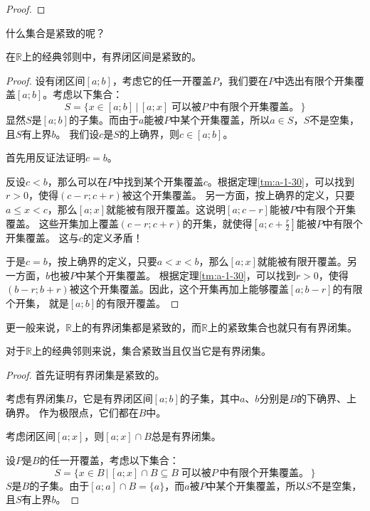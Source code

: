 \documentclass[12pt,UTF8]{ctexbook}
\begin{document}
\begin{appendix}
\begin{proof}
\end{proof}

什么集合是紧致的呢？

\begin{tm}\label{tm:a-3-10}
    在$\mathbb{R}$上的经典邻则中，有界闭区间是紧致的。
\end{tm}

\begin{proof}
    设有闭区间$[a;b]$，考虑它的任一开覆盖$P$，我们要在$P$中选出有限个开集覆盖$[a;b]$。考虑以下集合：
    $$ S = \{ x\in[a;b] \, | \, [a;x] \; \mbox{可以被}P\,\mbox{中有限个开集覆盖。} \, \} $$
    显然$S$是$[a;b]$的子集。而由于$a$能被$P$中某个开集覆盖，所以$a\in S$，$S$不是空集，且$S$有上界$b$。
    我们设$c$是$S$的上确界，则$c\in[a;b]$。

    首先用反证法证明$c=b$。

    反设$c < b$，那么可以在$P$中找到某个开集覆盖$c$。根据定理\ref{tm:a-1-30}，可以找到$r>0$，使得$(c-r;c+r)$被这个开集覆盖。
    另一方面，按上确界的定义，只要$a\leqslant x<c$，那么$[a;x]$就能被有限开覆盖。这说明$[a;c-r]$能被$P$中有限个开集覆盖。
    这些开集加上覆盖$(c-r;c+r)$的开集，就使得$\displaystyle\left[a;c+\frac{r}{2}\right]$能被$P$中有限个开集覆盖。
    这与$c$的定义矛盾！

    于是$c=b$，按上确界的定义，只要$a<x<b$，那么$[a;x]$就能被有限开覆盖。另一方面，$b$也被$P$中某个开集覆盖。
    根据定理\ref{tm:a-1-30}，可以找到$r>0$，使得$(b-r;b+r)$被这个开集覆盖。因此，这个开集再加上能够覆盖$[a;b-r]$的有限个开集，
    就是$[a;b]$的有限开覆盖。

\end{proof}

更一般来说，$\mathbb{R}$上的有界闭集都是紧致的，而$\mathbb{R}$上的紧致集合也就只有有界闭集。

\begin{tm}
    对于$\mathbb{R}$上的经典邻则来说，集合紧致当且仅当它是有界闭集。
\end{tm}

\begin{proof}
    首先证明有界闭集是紧致的。
    
    考虑有界闭集$B$，它是有界闭区间$[a;b]$的子集，其中$a$、$b$分别是$B$的下确界、上确界。
    作为极限点，它们都在$B$中。
    
    考虑闭区间$[a;x]$，则$[a;x]\cap B$总是有界闭集。
    
    设$P$是$B$的任一开覆盖，考虑以下集合：
    $$ S = \{ x\in B \, | \, [a;x]\cap B \subseteq B \; \mbox{可以被}P\,\mbox{中有限个开集覆盖。} \, \} $$
    $S$是$B$的子集。由于$[a;a]\cap B = \{a\}$，而$a$被$P$中某个开集覆盖，所以$S$不是空集，且$S$有上界$b$。
    

\end{proof}
\end{appendix}
\end{document}
